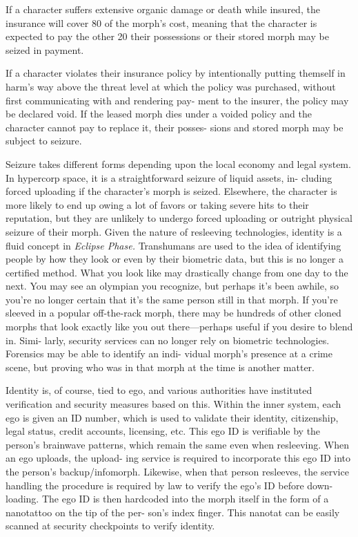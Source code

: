 If a character suffers extensive organic damage or 
death while insured, the insurance will cover 80%
of the morph's cost, meaning that the character is 
expected to pay the other 20%
their possessions or their stored morph may be 
seized in payment.

If a character violates their insurance policy by 
intentionally putting themself in harm's way above 
the threat level at which the policy was purchased, 
without first communicating with and rendering pay-
ment to the insurer, the policy may be declared void. 
If the leased morph dies under a voided policy and 
the character cannot pay to replace it, their posses-
sions and stored morph may be subject to seizure.

Seizure takes different forms depending upon the 
local economy and legal system. In hypercorp space, 
it is a straightforward seizure of liquid assets, in-
cluding forced uploading if the character's morph is 
seized. Elsewhere, the character is more likely to end 
up owing a lot of favors or taking severe hits to their 
reputation, but they are unlikely to undergo forced 
uploading or outright physical seizure of their morph.
Given the nature of resleeving technologies, identity 
is a fluid concept in \textit{Eclipse Phase.} Transhumans are 
used to the idea of identifying people by how they 
look or even by their biometric data, but this is no 
longer a certified method. What you look like may 
drastically change from one day to the next. You 
may see an olympian you recognize, but perhaps it's 
been awhile, so you're no longer certain that it's the 
same person still in that morph. If you're sleeved in a 
popular off-the-rack morph, there may be hundreds 
of other cloned morphs that look exactly like you out 
there—perhaps useful if you desire to blend in. Simi-
larly, security services can no longer rely on biometric 
technologies. Forensics may be able to identify an indi-
vidual morph's presence at a crime scene, but proving 
who was in that morph at the time is another matter.

Identity is, of course, tied to ego, and various 
authorities have instituted verification and security 
measures based on this. Within the inner system, each 
ego is given an ID number, which is used to validate 
their identity, citizenship, legal status, credit accounts, 
licensing, etc. This ego ID is verifiable by the person's 
brainwave patterns, which remain the same even 
when resleeving. When an ego uploads, the upload-
ing service is required to incorporate this ego ID into 
the person's backup/infomorph. Likewise, when that 
person resleeves, the service handling the procedure 
is required by law to verify the ego's ID before down-
loading. The ego ID is then hardcoded into the morph 
itself in the form of a nanotattoo on the tip of the per-
son's index finger. This nanotat can be easily scanned 
at security checkpoints to verify identity.

